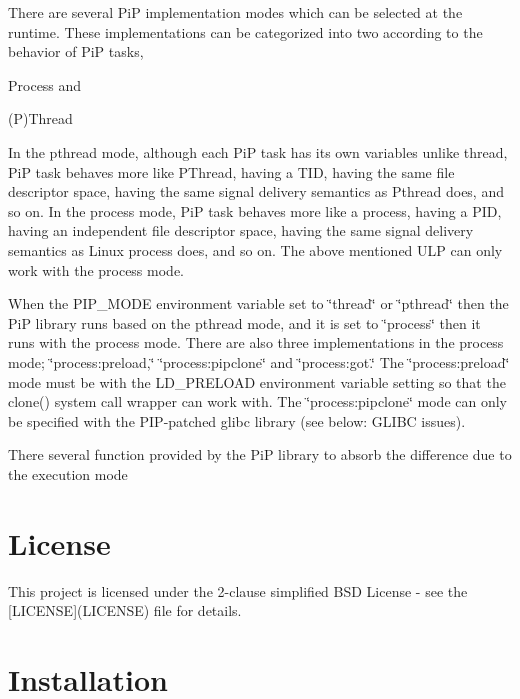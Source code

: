 \documentclass[twoside]{book}
\begin{document}
There are several Pi\-P implementation modes which can be selected at the runtime. These implementations can be categorized into two according to the behavior of Pi\-P tasks,


\begin{DoxyItemize}
\item Process and
\item (P)Thread
\end{DoxyItemize}

In the pthread mode, although each Pi\-P task has its own variables unlike thread, Pi\-P task behaves more like P\-Thread, having a T\-I\-D, having the same file descriptor space, having the same signal delivery semantics as Pthread does, and so on. In the process mode, Pi\-P task behaves more like a process, having a P\-I\-D, having an independent file descriptor space, having the same signal delivery semantics as Linux process does, and so on. The above mentioned U\-L\-P can only work with the process mode.

When the {\ttfamily P\-I\-P\-\_\-\-M\-O\-D\-E} environment variable set to \char`\"{}thread\char`\"{} or \char`\"{}pthread\char`\"{} then the Pi\-P library runs based on the pthread mode, and it is set to \char`\"{}process\char`\"{} then it runs with the process mode. There are also three implementations in the process mode; \char`\"{}process\-:preload,\char`\"{} \char`\"{}process\-:pipclone\char`\"{} and \char`\"{}process\-:got.\char`\"{} The \char`\"{}process\-:preload\char`\"{} mode must be with the L\-D\-\_\-\-P\-R\-E\-L\-O\-A\-D environment variable setting so that the clone() system call wrapper can work with. The \char`\"{}process\-:pipclone\char`\"{} mode can only be specified with the P\-I\-P-\/patched glibc library (see below\-: G\-L\-I\-B\-C issues).

There several function provided by the Pi\-P library to absorb the difference due to the execution mode

\section*{License}

This project is licensed under the 2-\/clause simplified B\-S\-D License -\/ see the \mbox{[}L\-I\-C\-E\-N\-S\-E\mbox{]}(L\-I\-C\-E\-N\-S\-E) file for details.

\section*{Installation}
\end{document}
